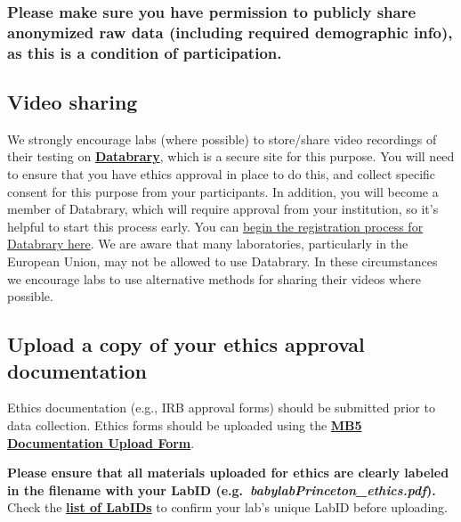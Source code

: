 \documentclass[
]{book}
\begin{document}
\subsubsection*{Please make sure you have permission to publicly share anonymized raw data (including required demographic info), as this is a condition of participation.}\label{please-make-sure-you-have-permission-to-publicly-share-anonymized-raw-data-including-required-demographic-info-as-this-is-a-condition-of-participation.}

\subsection{Video sharing}\label{video-sharing}

We strongly encourage labs (where possible) to store/share video recordings of their testing on \textbf{\href{https://nyu.databrary.org/}{Databrary}}, which is a secure site for this purpose. You will need to ensure that you have ethics approval in place to do this, and collect specific consent for this purpose from your participants. In addition, you will become a member of Databrary, which will require approval from your institution, so it's helpful to start this process early. You can \href{https://nyu.databrary.org/user/register?page=create}{begin the registration process for Databrary here}. We are aware that many laboratories, particularly in the European Union, may not be allowed to use Databrary. In these circumstances we encourage labs to use alternative methods for sharing their videos where possible.

\subsection{Upload a copy of your ethics approval documentation}\label{ethics-upload}

Ethics documentation (e.g., IRB approval forms) should be submitted prior to data collection. Ethics forms should be uploaded using the \textbf{\href{https://docs.google.com/forms/d/e/1FAIpQLScTTmcQl1P1F4UWe95Jo7u5bken40AyAefXCYUJ9iYbnWaG8Q/viewform?usp=sf_link}{MB5 Documentation Upload Form}}.

\textbf{Please ensure that all materials uploaded for ethics are clearly labeled in the filename with your LabID (e.g.~\emph{babylabPrinceton\_ethics.pdf}).} Check the \textbf{\href{https://manybabies.org/labids/}{list of LabIDs}} to confirm your lab's unique LabID before uploading.
\end{document}
